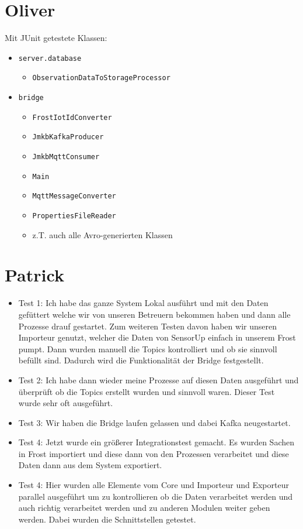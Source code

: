 \section{Oliver}
Mit JUnit getestete Klassen:
\begin{itemize}
	\item \texttt{server.database}
	\begin{itemize}
		\item \texttt{ObservationDataToStorageProcessor}
	\end{itemize}
	\item \texttt{bridge}
	\begin{itemize}
		\item \texttt{FrostIotIdConverter}
		\item \texttt{JmkbKafkaProducer}
		\item \texttt{JmkbMqttConsumer}
		\item \texttt{Main}
		\item \texttt{MqttMessageConverter}
		\item \texttt{PropertiesFileReader}
		\item z.T. auch alle Avro-generierten Klassen
	\end{itemize}
\end{itemize}

\section{Patrick}
\begin{itemize}
	\item Test 1: Ich habe das ganze System Lokal ausführt und mit den Daten gefüttert welche wir von unseren Betreuern bekommen haben und dann alle Prozesse drauf gestartet. Zum weiteren Testen davon haben wir unseren Importeur genutzt, welcher die Daten von SensorUp einfach in unserem Frost pumpt. Dann wurden manuell die Topics kontrolliert und ob sie sinnvoll befüllt sind. Dadurch wird die Funktionalität der Bridge festgestellt.
	\item Test 2: Ich habe dann wieder meine Prozesse auf diesen Daten ausgeführt und überprüft ob die Topics erstellt wurden und sinnvoll waren. Dieser Test wurde sehr oft ausgeführt.
	\item Test 3: Wir haben die Bridge laufen gelassen und dabei Kafka neugestartet.
	\item Test 4: Jetzt wurde ein größerer Integrationstest gemacht. Es wurden Sachen in Frost importiert und diese dann von den Prozessen verarbeitet und diese Daten dann aus dem System exportiert.
	\item Test 4: Hier wurden alle Elemente vom Core und Importeur und Exporteur parallel ausgeführt um zu kontrollieren ob die Daten verarbeitet werden und auch richtig verarbeitet werden und zu anderen Modulen weiter geben werden. Dabei wurden die Schnittstellen getestet.
\end{itemize}

